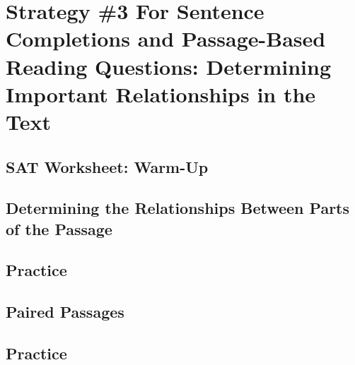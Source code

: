 \chapter{Strategy \#3 For Sentence Completions and Passage-Based Reading Questions: Determining Important Relationships in the Text}

\section{SAT Worksheet: Warm-Up}
\section{Determining the Relationships Between Parts of the Passage}
\section{Practice}
\section{Paired Passages}
\section{Practice}
